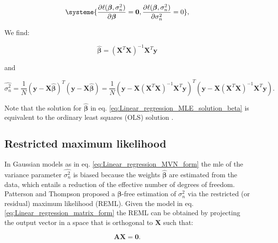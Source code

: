 \begin{equation} \label{eq:Linear_regression_MLE_system}
\systeme{
    \dfrac{\partial \ell(\boldsymbol{\beta}, \sigma_n^2)}{\partial \boldsymbol{\beta}} = \mathbf{0},
    \dfrac{\partial \ell(\boldsymbol{\beta}, \sigma_n^2)}{\partial \sigma_n^2} = 0
    },
\end{equation}

We find:

\begin{equation} \label{eq:Linear_regression_MLE_solution_beta}
\hat{\boldsymbol{\beta}} = (\mathbf{X}^T\mathbf{X})^{-1}\mathbf{X}^T\mathbf{y} 
\end{equation}

and

\begin{equation} \label{eq:Linear_regression_MLE_solution_sigma}
 \hat{\sigma_n^2} = \frac{1}{N}(\mathbf{y}-\mathbf{X}\hat{\boldsymbol{\beta}})^T(\mathbf{y}-\mathbf{X}\hat{\boldsymbol{\beta}}) = \frac{1}{N}(\mathbf{y}-\mathbf{X}(\mathbf{X}^T\mathbf{X})^{-1}\mathbf{X}^T\mathbf{y})^T(\mathbf{y}-\mathbf{X}(\mathbf{X}^T\mathbf{X})^{-1}\mathbf{X}^T\mathbf{y}). 
\end{equation}

Note that the solution for $\hat{\boldsymbol{\beta}}$ in eq. \eqref{eq:Linear_regression_MLE_solution_beta} is equivalent to the ordinary least squares (OLS) solution \cite{laird2010fundamentals}.

\newpage

\subsection{Restricted maximum likelihood}

In Gaussian models as in eq. \eqref{eq:Linear_regression_MVN_form} the \gls{mle} of the variance parameter $\hat{\sigma_n^2}$ is biased because the weights $\hat{\boldsymbol{\beta}}$ are estimated from the data, which entails a reduction of the effective number of degrees of freedom.
Patterson and Thompson \cite{patterson1971recovery} proposed a $\boldsymbol{\beta}$-free estimation of $\sigma_n^2$ via the restricted (or residual) maximum likelihood (REML).
Given the model in eq. \eqref{eq:Linear_regression_matrix_form} the REML can be obtained by projecting the output vector in a space that is orthogonal to $\mathbf{X}$ such that:

\begin{equation}\label{eq:REML_0_projection}
    \mathbf{A}\mathbf{X} = \mathbf{0}.
\end{equation}

